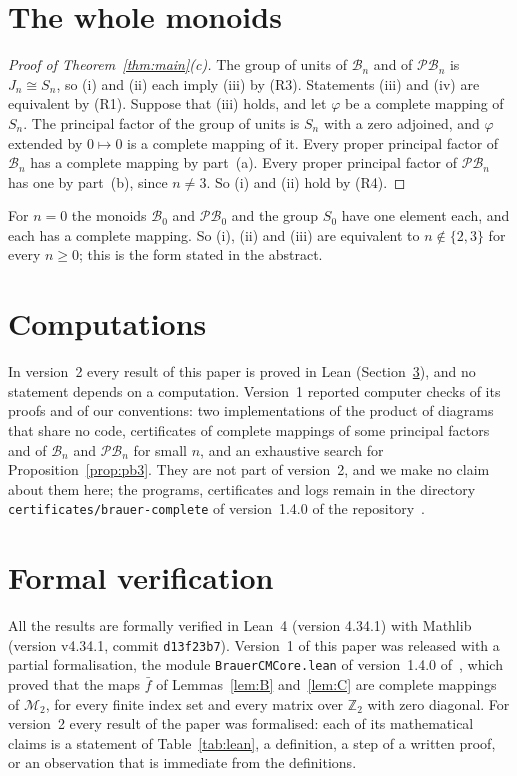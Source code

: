 \documentclass[11pt]{article}
\theoremstyle{remark}
\newcommand{\B}{\mathcal B}
\newcommand{\PB}{\mathcal{PB}}
\newcommand{\M}{\mathcal M}
\newcommand{\Z}{\mathbb Z}
\newcommand{\Mt}{\M_2}
\begin{document}
\section{The whole monoids}\label{sec:whole}

\begin{proof}[Proof of Theorem~\ref{thm:main}(c)]
The group of units of $\B_n$ and of $\PB_n$ is $J_n\cong S_n$, so (i) and (ii)
each imply (iii) by (R3). Statements (iii) and (iv) are equivalent by (R1).
Suppose that (iii) holds, and let $\varphi$ be a complete mapping of $S_n$. The
principal factor of the group of units is $S_n$ with a zero adjoined, and
$\varphi$ extended by $0\mapsto0$ is a complete mapping of it. Every proper
principal factor of $\B_n$ has a complete mapping by part~(a). Every proper
principal factor of $\PB_n$ has one by part~(b), since $n\ne3$. So (i) and
(ii) hold by (R4).
\end{proof}

For $n=0$ the monoids $\B_0$ and $\PB_0$ and the group $S_0$ have one element
each, and each has a complete mapping. So (i), (ii) and (iii) are equivalent to
$n\notin\{2,3\}$ for every $n\ge0$; this is the form stated in the abstract.

\section{Computations}\label{sec:comp}
In version~2 every result of this paper is proved in Lean
(Section~\ref{sec:lean}), and no statement depends on a computation.
Version~1 reported computer checks of its proofs and of our conventions: two
implementations of the product of diagrams that share no code, certificates of
complete mappings of some principal factors and of $\B_n$ and $\PB_n$ for small
$n$, and an exhaustive search for Proposition~\ref{prop:pb3}. They are not part
of version~2, and we make no claim about them here; the programs,
certificates and logs remain in the directory
\texttt{certificates/brauer-complete} of version~1.4.0 of the
repository~\cite{repo}.

\section{Formal verification}\label{sec:lean}
All the results are formally verified in Lean~4 (version 4.34.1) with
Mathlib~\cite{mathlib} (version v4.34.1, commit \texttt{d13f23b7}).
Version~1 of this paper was released with a partial formalisation, the module
\texttt{BrauerCMCore.lean} of version~1.4.0 of~\cite{repo}, which proved that
the maps $\bar f$ of Lemmas~\ref{lem:B} and~\ref{lem:C} are complete mappings
of $\Mt$, for every finite index set and every matrix over $\Z_2$ with zero
diagonal. For version~2 every result of the paper was formalised: each of its
mathematical claims is a statement of Table~\ref{tab:lean}, a definition, a
step of a written proof, or an observation that is immediate from the
definitions.
\end{document}
